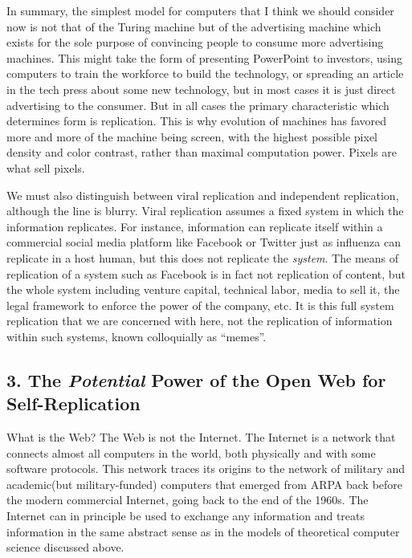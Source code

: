 In summary, the simplest model for computers that I think we should
consider now is not that of the Turing machine but of the advertising
machine which exists for the sole purpose of convincing people to
consume more advertising machines. This might take the form of
presenting PowerPoint to investors, using computers to train the
workforce to build the technology, or spreading an article in the tech
press about some new technology, but in most cases it is just direct
advertising to the consumer. But in all cases the primary characteristic
which determines form is replication. This is why evolution of machines
has favored more and more of the machine being screen, with the highest
possible pixel density and color contrast, rather than maximal
computation power. Pixels are what sell pixels.

We must also distinguish between viral replication and independent
replication, although the line is blurry. Viral replication assumes a
fixed system in which the information replicates. For instance,
information can replicate itself within a commercial social media
platform like Facebook or Twitter just as influenza can replicate in a
host human, but this does not replicate the \emph{system}. The means of
replication of a system such as Facebook is in fact not replication of
content, but the whole system including venture capital, technical
labor, media to sell it, the legal framework to enforce the power of the
company, etc. It is this full system replication that we are concerned
with here, not the replication of information within such systems, known
colloquially as ``memes''.

\subsection{\texorpdfstring{3. The \emph{Potential} Power of the Open
Web for
Self-Replication}{3. The Potential Power of the Open Web for Self-Replication}}\label{the-potential-power-of-the-open-web-for-self-replication}

What is the Web? The Web is not the Internet. The Internet is a network
that connects almost all computers in the world, both physically and
with some software protocols. This network traces its origins to the
network of military and academic(but military-funded) computers that
emerged from ARPA back before the modern commercial Internet, going back
to the end of the 1960s. The Internet can in principle be used to
exchange any information and treats information in the same abstract
sense as in the models of theoretical computer science discussed above.

